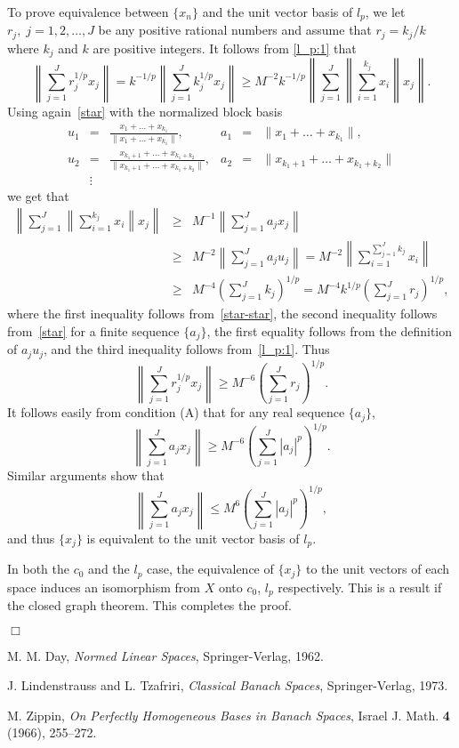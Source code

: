 \documentclass[12pt]{report}
\newcommand\done{\begin{flushright}$\Box$\end{flushright}}
\begin{document}
To prove equivalence between $\{x_n\}$ and the unit vector basis of $l_p$, we let $r_j,\;j=1,2,\ldots,J$
be any positive rational numbers and assume that $r_j = k_j/k$ where $k_j$ and $k$ are
positive integers.  It follows from \eqref{l_p:1} that
$$
\left\|\sum_{j=1}^J r_j^{1/p} x_j \right\| = k^{-1/p}\left\|\sum_{j=1}^J k_j^{1/p} x_j \right\|
\geq M^{-2}k^{-1/p}\left\|\sum_{j=1}^J \left\|{\textstyle \sum_{i=1}^{k_j}} x_i \right\|x_j\right\|.
$$
Using again~\eqref{star} with the normalized block basis
\[
\begin{array}{llcllc}
u_1 & = &{\displaystyle \frac{x_1 + \ldots + x_{k_1}}{\|x_1 + \ldots + x_{k_1}\|}}, &
a_1 & = &\|x_1 + \ldots + x_{k_1}\|,\\
u_2 & = &{\displaystyle \frac{x_{k_{1}+1} + \ldots + x_{k_{1}+k_{2}}}{\|x_{k_{1}+1} + \ldots + 
x_{k_{1}+k_{2}}\|}}, &
a_2 & = &\|x_{k_{1}+1} + \ldots + x_{k_{1}+k_{2}}\| \\
    &\vdots
\end{array}
\]
we get that
\begin{eqnarray*}
\left\|\sum_{j=1}^J \left\|{\textstyle \sum_{i=1}^{k_j}} x_i \right\|x_j\right\| &\geq &
M^{-1}\left\|\sum_{j=1}^J a_j x_j \right\| \\
& \geq & M^{-2}\left\|\sum_{j=1}^J a_j u_j \right\| =
M^{-2}\left\|\sum_{i=1}^{\sum_{j=1}^J k_j} x_i \right\| \\
& \geq & M^{-4}\left(\sum_{j=1}^J k_j\right)^{1/p} = M^{-4}k^{1/p}\left(\sum_{j=1}^J r_j\right)^{1/p},
\end{eqnarray*}
where the first inequality follows from~\eqref{star-star}, the second inequality follows
from~\eqref{star} for a finite sequence $\{a_j\}$, the first equality follows from the
definition of $a_j u_j$, and the third inequality follows from~\eqref{l_p:1}.
Thus
$$
\left\|\sum_{j=1}^J r_j^{1/p} x_j \right\| \geq M^{-6}\left(\sum_{j=1}^J r_j \right)^{1/p}.
$$
It follows easily from condition (A) that for any real sequence $\{a_j\}$,
$$
\left\|\sum_{j=1}^J a_j  x_j \right\| \geq M^{-6}\left(\sum_{j=1}^J |a_j|^p \right)^{1/p}.
$$
Similar arguments show that
$$
\left\|\sum_{j=1}^J a_j  x_j \right\| \leq M^{6}\left(\sum_{j=1}^J |a_j|^p \right)^{1/p},
$$
and thus $\{x_j\}$ is equivalent to the unit vector basis of $l_p$.

In both the $c_0$ and the $l_p$ case, the equivalence of $\{x_j\}$ to the unit
vectors of each space induces an isomorphism from $X$ onto $c_0$, $l_p$ respectively.
This is a result if the closed graph theorem.
This completes the proof.\done

\begin{thebibliography}{99}

 M. M. Day, {\em Normed Linear Spaces}, Springer-Verlag,
1962.

 J. Lindenstrauss and L. Tzafriri, {\em Classical Banach Spaces},
Springer-Verlag, 1973.

 M. Zippin, {\em On Perfectly Homogeneous Bases in Banach
Spaces}, Israel J. Math. {\bf 4} (1966), 255--272.

\end{thebibliography}
\end{document}
